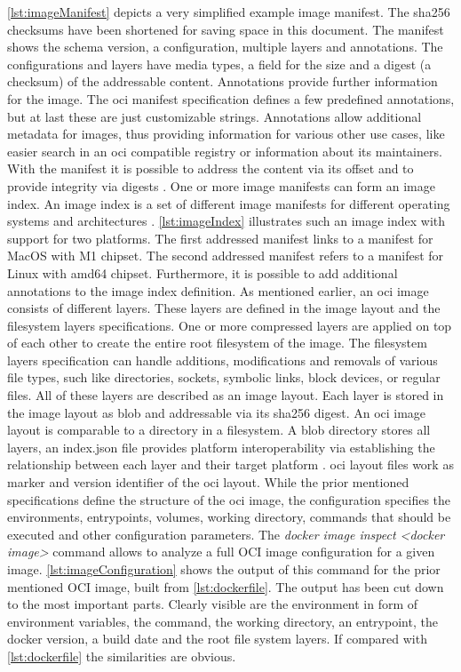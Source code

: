 \documentclass[titlepage]{report}
\begin{document}
\autoref{lst:imageManifest} depicts a very simplified example image manifest. The \gls{sha256} checksums have been shortened for saving space in this document.
The manifest shows the schema version, a configuration, multiple layers and annotations. The configurations and layers have media types, a field for the
size and a digest (a checksum) of the addressable content. Annotations provide further information for the image. The \gls{oci} manifest specification
defines a few predefined annotations, but at last these are just customizable strings. Annotations allow additional metadata for images, thus
providing information for various other use cases, like easier search in an \gls{oci} compatible registry or information about its maintainers.
With the manifest it is possible to address the content via its offset and to provide integrity via digests \cite{ImageManifestSpec}. One or more image manifests can form
an image index. An image index is a set of different image manifests for different operating systems and architectures \cite{ImageIndexSpec}. \autoref{lst:imageIndex} illustrates
such an image index with support for two platforms. The first addressed manifest links to a manifest for MacOS with M1 chipset. The second addressed manifest
refers to a manifest for Linux with amd64 chipset. Furthermore, it is possible to add additional annotations to the image index definition. As mentioned earlier,
an \gls{oci} image consists of different layers. These layers are defined in the image layout and the filesystem layers specifications. One or more compressed layers are applied
on top of each other to create the entire root filesystem of the image\cite{ImageFSSpec}. The filesystem layers specification can handle 
additions, modifications and removals of various file types, such like directories, sockets, symbolic links, block devices, or regular files\cite{ImageFSSpec}.
All of these layers are described as an image layout. Each layer is stored in the image layout as \gls{blob} and addressable via its \gls{sha256} digest. An \gls{oci} image layout
is comparable to a directory in a filesystem. A \gls{blob} directory stores all layers, an index.json file provides platform interoperability via establishing the relationship
between each layer and their target platform \cite{ImageLayoutSpec}. \gls{oci} layout files work as marker and version identifier of the \gls{oci} layout. While the prior mentioned specifications
define the structure of the \gls{oci} image, the configuration specifies the environments, entrypoints, volumes, working directory, commands that should be executed and other configuration parameters.
The \emph{docker image inspect <docker image>} command allows to analyze a full OCI image configuration for a given image. \autoref{lst:imageConfiguration} shows the output of this command
for the prior mentioned OCI image, built from \autoref{lst:dockerfile}. The output has been cut down to the most important parts. Clearly visible are the environment in form of environment
variables, the command, the working directory, an entrypoint, the docker version, a build date and the root file system layers. If compared with \autoref{lst:dockerfile} the similarities are obvious. 
\end{document}
